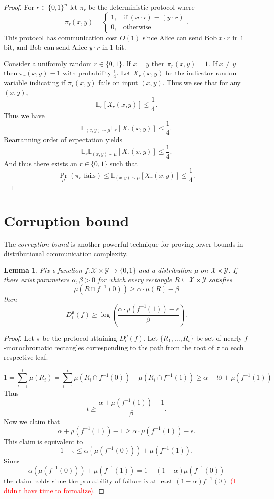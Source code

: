 \documentclass[11pt]{amsart}
\theoremstyle{plain}
\newtheorem{lemma}{Lemma}
\theoremstyle{definition}
\theoremstyle{plain}
\newcommand{\calX}{\mathcal{X}}
\newcommand{\calY}{\mathcal{Y}}
\newcommand{\replacethistext}[1]{\textcolor{red}{#1}}
\begin{document}
\begin{proof}
For $r \in \{0,1\}^n$ let  $\pi_r$ be the deterministic protocol where 
$$\pi_r(x,y) = \begin{cases} 1, &\text{if } (x\cdot r)  = (y\cdot r) \\ 0, &\text{otherwise}\end{cases}.$$
This protocol has communication cost $O(1)$ since Alice can send Bob $x\cdot r$ in $1$ bit, and Bob can send Alice $y \cdot r$ in $1$ bit.

Consider a uniformly random $r \in \{0,1\}$. If $x=y$ then $\pi_r(x,y) = 1$. If $x\neq y$ then $\pi_r(x,y) =1$ with probability $\frac{1}{4}$. Let $X_r(x,y)$ be the indicator random variable indicating if $\pi_r(x,y)$ fails on input $(x,y)$. Thus we see that for any $(x,y)$,
$$\mathbb{E}_r[X_r(x,y)] \leq \frac{1}{4}.$$
Thus we have
$$\mathbb{E}_{(x,y)\sim \mu}\mathbb{E}_r[X_r(x,y)] \leq \frac{1}{4}.$$
Rearranning order of expectation yields
$$\mathbb{E}_{r}\mathbb{E}_{(x,y)\sim \mu}[X_r(x,y)] \leq \frac{1}{4}.$$
And thus there exists an $r \in \{0,1\}$ such that
$$\Pr_\mu(\pi_r \text{ fails}) \leq \mathbb{E}_{(x,y)\sim \mu}[X_r(x,y)] \leq \frac{1}{4}.$$
\end{proof}



\newpage \section{Corruption bound}

The \emph{corruption bound} is another powerful technique for proving lower bounds in distributional communication complexity.

\begin{lemma}
Fix a function $f : \calX \times \calY \to \{0,1\}$ and a distribution
$\mu$ on $\calX \times \calY$.
If there exist parameters $\alpha, \beta > 0$ for which
every rectangle $R \subseteq \calX \times \calY$ satisfies 
\[
\mu(R \cap f^{-1}(0)) \ge \alpha \cdot \mu(R) - \beta
\]
then
\[
D^\mu_\epsilon(f) \ge \log\left( \frac{\alpha \cdot \mu(f^{-1}(1)) - \epsilon}{\beta}\right).
\]
\end{lemma}

\begin{proof}
Let $\pi$ be the protocol attaining $D_\epsilon^{\mu}(f)$.
Let $\{R_1, \dots, R_t\}$ be set of nearly $f$-monochromatic rectangles corresponding to the path from the root of $\pi$ to each respective leaf.

$$1= \sum_{i=1}^t \mu(R_i) = \sum_{i=1}^t \mu(R_i \cap f^{-1}(0)) + \mu(R_i\cap f^{-1}(1)) \geq \alpha - t \beta +\mu(f^{-1}(1))$$
Thus
$$t \geq \frac{\alpha + \mu(f^{-1}(1)) -1}{\beta}.$$
Now we claim that 
$$\alpha + \mu(f^{-1}(1)) -1 \geq \alpha\cdot \mu(f^{-1}(1)) -\epsilon.$$
This claim is equivalent to
$$1-\epsilon \leq \alpha(\mu(f^{-1}(0))) +\mu(f^{-1}(1)).$$
Since 
$$\alpha(\mu(f^{-1}(0))) +\mu(f^{-1}(1)) = 1-(1-\alpha) \mu(f^{-1}(0))$$
the claim holds since the probability of failure is at least $(1-\alpha)f^{-1}(0)$ \replacethistext{(I didn't have time to formalize)}.
\end{proof}
\end{document}
